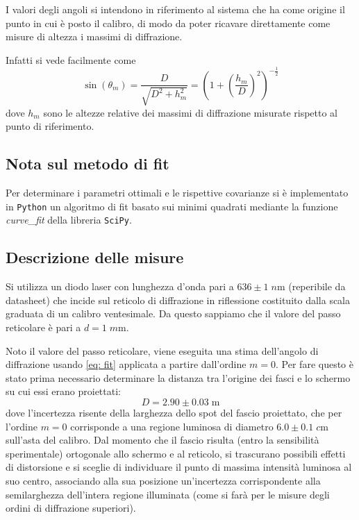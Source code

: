 \documentclass[10pt, a4paper, italian]{article}
\begin{document}
I valori degli angoli si intendono in riferimento al sistema che ha come
origine il punto in cui è posto il calibro, di modo da poter ricavare
direttamente come misure di altezza i massimi di diffrazione.

Infatti si vede facilmente come
\begin{equation}
\sin(\theta _m) = \frac{D}{\sqrt{D^2 + h_m^2}} = 
\left(1 + \left(\frac{h_m}{D}\right)^2\right)^{-\frac{1}{2}}
\label{eq: gon}
\end{equation}
dove $h_m$ sono le altezze relative dei massimi di diffrazione misurate
rispetto al punto di riferimento.

\subsection{Nota sul metodo di fit}
Per determinare i parametri ottimali e le rispettive covarianze si \`e
implementato in \verb+Python+ un algoritmo di fit basato sui minimi quadrati
mediante la funzione \emph{curve\_fit} della libreria \texttt{SciPy}.

\subsection{Descrizione delle misure}
Si utilizza un diodo laser con lunghezza d'onda pari a $636 \pm 1 \; \si{n\m}$
(reperibile da datasheet) che incide sul reticolo di diffrazione in
riflessione costituito dalla scala graduata di un calibro ventesimale.
Da questo sappiamo che il valore del passo reticolare è pari a
$d = 1 \; \si{m\m}$.

Noto il valore del passo reticolare, viene eseguita una stima dell'angolo di
diffrazione usando \cref{eq: fit} applicata a partire dall'ordine $m = 0$.
Per fare questo è stato prima necessario determinare la distanza tra l'origine
dei fasci e lo schermo su cui essi erano proiettati:
\[
D = 2.90 \pm 0.03 \; \si{\m}
\]
dove l'incertezza risente della larghezza dello spot del fascio proiettato,
che per l'ordine $m = 0$ corrisponde a una regione luminosa di diametro
$6.0 \pm 0.1 \; \si{c\m}$ sull'asta del calibro.
Dal momento che il fascio risulta (entro la sensibilità sperimentale)
ortogonale allo schermo e al reticolo, si trascurano possibili effetti di
distorsione e si sceglie di individuare il punto di massima intensità luminosa
al suo centro, associando alla sua posizione un'incertezza corrispondente
alla semilarghezza dell'intera regione illuminata (come si farà per le misure
degli ordini di diffrazione superiori).
\end{document}
